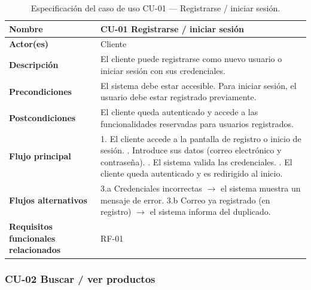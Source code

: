\begin{table}[H]
\centering
\small
\begin{tabular}{|m{}|m{}|}
\hline
\textbf{Nombre} & CU-01 Registrarse / iniciar sesión \\ \hline
\textbf{Actor(es)} & Cliente \\ \hline
\textbf{Descripción} & El cliente puede registrarse como nuevo usuario o iniciar sesión con sus credenciales. \\ \hline
\textbf{Precondiciones} & El sistema debe estar accesible. Para iniciar sesión, el usuario debe estar registrado previamente. \\ \hline
\textbf{Postcondiciones} & El cliente queda autenticado y accede a las funcionalidades reservadas para usuarios registrados. \\ \hline
\textbf{Flujo principal} & 1. El cliente accede a la pantalla de registro o inicio de sesión. \newline 2. Introduce sus datos (correo electrónico y contraseña). \newline 3. El sistema valida las credenciales. \newline 4. El cliente queda autenticado y es redirigido al inicio. \\ \hline
\textbf{Flujos alternativos} & 3.a Credenciales incorrectas $\rightarrow$ el sistema muestra un mensaje de error. \newline 3.b Correo ya registrado (en registro) $\rightarrow$ el sistema informa del duplicado. \\ \hline
\textbf{Requisitos funcionales relacionados} & RF-01 \\ \hline
\end{tabular}
\caption{Especificación del caso de uso CU-01 — Registrarse / iniciar sesión.}
\end{table}

\subsubsection{CU-02 Buscar / ver productos}

